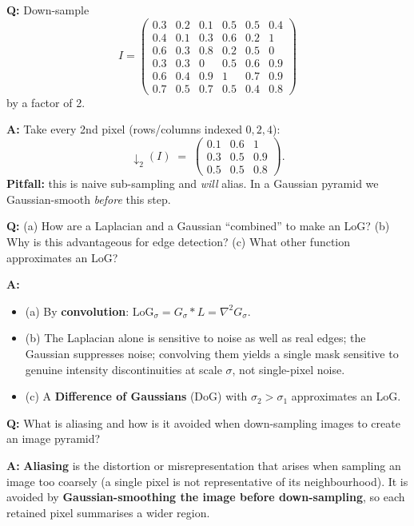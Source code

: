 \begin{exbox}
\textbf{Q:} Down-sample
\[
I = \begin{pmatrix}
0.3 & 0.2 & 0.1 & 0.5 & 0.5 & 0.4 \\
0.4 & 0.1 & 0.3 & 0.6 & 0.2 & 1 \\
0.6 & 0.3 & 0.8 & 0.2 & 0.5 & 0 \\
0.3 & 0.3 & 0   & 0.5 & 0.6 & 0.9 \\
0.6 & 0.4 & 0.9 & 1   & 0.7 & 0.9 \\
0.7 & 0.5 & 0.7 & 0.5 & 0.4 & 0.8
\end{pmatrix}
\]
by a factor of 2.

\textbf{A:} Take every 2nd pixel (rows/columns indexed $0, 2, 4$):
\[
{\downarrow}_2(I) \;=\; \begin{pmatrix} 0.1 & 0.6 & 1 \\ 0.3 & 0.5 & 0.9 \\ 0.5 & 0.5 & 0.8 \end{pmatrix}.
\]
\textbf{Pitfall:} this is naive sub-sampling and \emph{will} alias. In a Gaussian pyramid we Gaussian-smooth \emph{before} this step.
\end{exbox}

\begin{exbox}
\textbf{Q:} (a) How are a Laplacian and a Gaussian ``combined'' to make an LoG? (b) Why is this advantageous for edge detection? (c) What other function approximates an LoG?

\textbf{A:}
\begin{itemize}
  \item (a) By \textbf{convolution}: $\text{LoG}_\sigma = G_\sigma \ast L = \nabla^2 G_\sigma$.
  \item (b) The Laplacian alone is sensitive to noise as well as real edges; the Gaussian suppresses noise; convolving them yields a single mask sensitive to genuine intensity discontinuities at scale $\sigma$, not single-pixel noise.
  \item (c) A \textbf{Difference of Gaussians} (DoG) with $\sigma_2 > \sigma_1$ approximates an LoG.
\end{itemize}
\end{exbox}

\begin{exbox}
\textbf{Q:} What is aliasing and how is it avoided when down-sampling images to create an image pyramid?

\textbf{A:} \textbf{Aliasing} is the distortion or misrepresentation that arises when sampling an image too coarsely (a single pixel is not representative of its neighbourhood). It is avoided by \textbf{Gaussian-smoothing the image before down-sampling}, so each retained pixel summarises a wider region.
\end{exbox}

